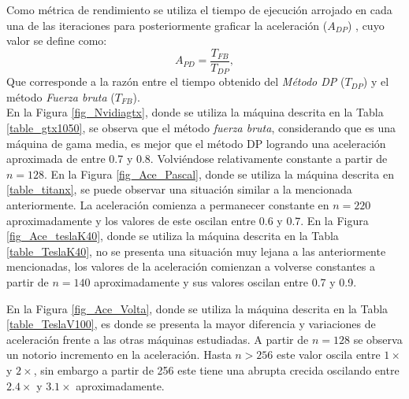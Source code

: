 \documentclass[10pt, conference, compsocconf, onecolumn]{IEEEtran}
\begin{document}
 Como m\'etrica de rendimiento se utiliza el tiempo de ejecuci\'on arrojado en cada una de las iteraciones para posteriormente graficar la aceleraci\'on ($A_{DP}$) \cite{ASurvey2014}, cuyo valor se define como: 
 \begin{equation}
 \label{ecuacion_Speed_Up}
 \textbf{}A_{PD}=\dfrac{T_{FB}}{T_{DP}},
 \end{equation}
 Que corresponde a la raz\'on entre el tiempo obtenido del \textit{M\'etodo DP} ($T_{DP}$) y el m\'etodo \textit{Fuerza bruta} ($T_{FB}$).\\
 En la Figura \ref{fig_Nvidiagtx}, donde se utiliza la m\'aquina descrita en la Tabla \ref{table_gtx1050}, se observa que el m\'etodo \textit{fuerza bruta}, considerando que es una m\'aquina de gama media, es mejor que el m\'etodo DP logrando una aceleraci\'on aproximada de  entre 0.7 y 0.8. Volvi\'endose relativamente constante a partir de $n=128$. En la Figura \ref{fig_Ace_Pascal}, donde se utiliza la m\'aquina descrita en \ref{table_titanx}, se puede observar una situaci\'on similar a la mencionada anteriormente. La aceleraci\'on comienza a permanecer constante en $n=220$ aproximadamente y los valores de este oscilan entre 0.6 y 0.7. En la Figura \ref{fig_Ace_teslaK40}, donde se utiliza la m\'aquina descrita en la Tabla \ref{table_TeslaK40}, no se presenta una situaci\'on muy lejana a las anteriormente mencionadas, los valores de la aceleraci\'on comienzan a volverse constantes a partir de $n=140$ aproximadamente y sus valores oscilan entre 0.7 y 0.9.
 

 

 
 En la Figura \ref{fig_Ace_Volta}, donde se utiliza la m\'aquina descrita en la Tabla \ref{table_TeslaV100}, es donde se presenta la mayor diferencia y variaciones de aceleraci\'on frente a las otras m\'aquinas estudiadas. A partir de $n=128$ se observa un notorio incremento en la aceleraci\'on. Hasta $n>256$ este valor oscila entre $1\times$ y $2\times$, sin embargo a partir de 256 este tiene una abrupta crecida oscilando entre $2.4\times$ y $3.1\times$ aproximadamente.
 
\end{document}

